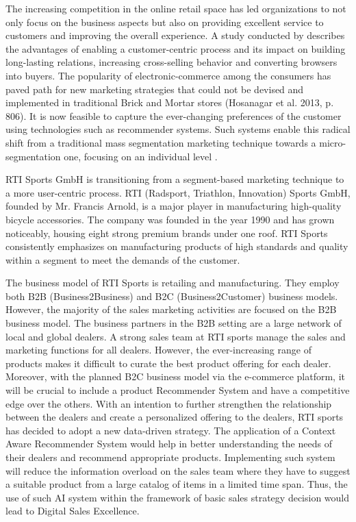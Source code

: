 The increasing competition in the online retail space has led organizations to not only focus on the business aspects but also on providing excellent service to customers and improving the overall experience. A study conducted by \textcite[117]{Schafer2001} describes the advantages of enabling a customer-centric process and its impact on building long-lasting relations, increasing cross-selling behavior and converting browsers into buyers. The popularity of electronic-commerce among the consumers has paved path for new marketing strategies that could not be devised and implemented in traditional Brick and Mortar stores \autocite[806]{Hosanagar2013} (Hosanagar et al. 2013, p. 806). It is now feasible to capture the ever-changing preferences of the customer using technologies such as recommender systems. Such systems enable this radical shift from a traditional mass segmentation marketing technique towards a micro-segmentation one, focusing on an individual level \autocite[5]{CapgeminiconsultingESSECBusinessSchool2016}. \\ \par 
\noindent
RTI Sports GmbH is transitioning from a segment-based marketing technique to a more user-centric process. RTI (Radsport, Triathlon, Innovation) Sports GmbH, founded by Mr. Francis Arnold, is a major player in manufacturing high-quality bicycle accessories. The company was founded in the year 1990 and has grown noticeably, housing eight strong premium brands under one roof. RTI Sports consistently emphasizes on manufacturing products of high standards and quality within a segment to meet the demands of the customer.  \\ \par
\noindent
The business model of RTI Sports is retailing and manufacturing. They employ both B2B (Business2Business) and B2C (Business2Customer) business models. However, the majority of the sales marketing activities are focused on the B2B business model. The business partners in the B2B setting are a large network of local and global dealers. A strong sales team at RTI sports manage the sales and marketing functions for all dealers. However, the ever-increasing range of products makes it difficult to curate the best product offering for each dealer. Moreover, with the planned B2C business model via the e-commerce platform, it will be crucial to include a product Recommender System and have a competitive edge over the others. With an intention to further strengthen the relationship between the dealers and create a personalized offering to the dealers, RTI sports has decided to adopt a new data-driven strategy. The application of a Context Aware Recommender System would help in better understanding the needs of their dealers and recommend appropriate products. Implementing such system will reduce the information overload on the sales team where they have to suggest a suitable product from a large catalog of items in a limited time span. Thus, the use of such AI system within the framework of basic sales strategy decision would lead to Digital Sales Excellence.  \\ \par
